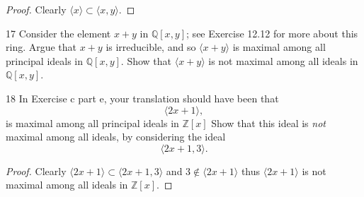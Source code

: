 \begin{proof}
    Clearly $\langle x \rangle \subset \langle x, y \rangle$.
\end{proof}

\begin{problem}{17}
    Consider the element $x + y$ in $\mathbb{Q}[x, y]$; see Exercise 12.12
    for more about this ring. Argue that $x + y$ is irreducible, and so 
    $\langle x + y \rangle$ is maximal among all principal ideals in $\mathbb{Q}[x, y]$.
    Show that $\langle x + y \rangle$ is not maximal among all ideals in $\mathbb{Q}[x, y]$.
\end{problem}
\unsolved

\begin{problem}{18}
    In Exercise c part e, your translation should have been that 
    \[\langle 2x + 1 \rangle,\]
    is maximal among all principal ideals in $\mathbb{Z}[x]$
    Show that this ideal is \emph{not} maximal among all ideals,
    by considering the ideal 
    \[\langle 2x + 1, 3 \rangle.\]
\end{problem}
\solved

\begin{proof}
    Clearly $\langle 2x + 1 \rangle \subset \langle 2x + 1, 3 \rangle$
        and $3 \notin \langle 2x + 1 \rangle$ thus $\langle 2x + 1 \rangle$
        is not maximal among all ideals in $\mathbb{Z}[x]$.
\end{proof}
